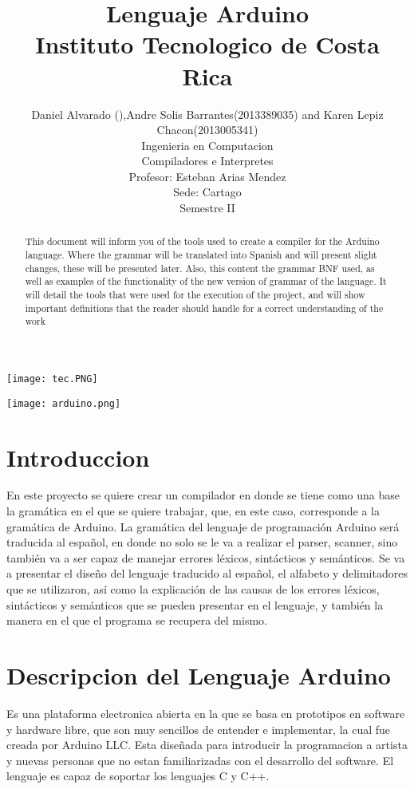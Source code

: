 \documentclass[11pt,twocolumn,spanish]{article}
\title{Lenguaje Arduino\\Instituto Tecnologico de Costa Rica}
\author{Daniel Alvarado (),Andre Solis Barrantes(2013389035) {\upshape and} Karen Lepiz Chacon(2013005341) \\ Ingenieria en Computacion
    \\Compiladores e Interpretes
    \\Profesor: Esteban Arias Mendez
    \\Sede: Cartago
    \\Semestre II}
\begin{document}
\begin{figure*}[t]
\centerline{\texttt{[image: tec.PNG]}}
\label{fig:videocomparison}
\end{figure*}



\begin{figure*}[t]
\centerline{\texttt{[image: arduino.png]}}
\end{figure*}
\maketitle




\begin{abstract}
This document will inform you of the tools used to create a compiler for the Arduino language. Where the grammar will be translated into Spanish and will present slight changes, these will be presented later. Also, this content the grammar BNF used, as well as examples of the functionality of the new version of grammar of the language.
It will detail the tools that were used for the execution of the project, and will show important definitions that the reader should handle for a correct understanding of the work
\end{abstract}

\section{Introduccion}
En este proyecto se quiere crear un compilador en donde se tiene como una base la gramática en el que se quiere trabajar, que, en este caso, corresponde a la gramática de Arduino. La gramática del lenguaje de programación Arduino será traducida al español, en donde no solo se le va a realizar el parser, scanner, sino también va a ser capaz de manejar errores léxicos, sintácticos y semánticos. 
Se va a presentar el diseño del lenguaje traducido al español, el alfabeto y delimitadores que se utilizaron, así como la explicación de las causas de los errores léxicos, sintácticos y semánticos que se pueden presentar en el lenguaje, y también la manera en el que el programa se recupera del mismo.
\section{Descripcion del Lenguaje Arduino}
Es una plataforma electronica abierta en la que se basa en prototipos en software y hardware libre, que son muy sencillos de entender e implementar, la cual fue creada por Arduino LLC.
Esta diseñada para introducir la programacion a artista y nuevas personas que no estan familiarizadas con el desarrollo del software. El lenguaje es capaz de soportar los lenguajes C y C++. 
\end{document}
